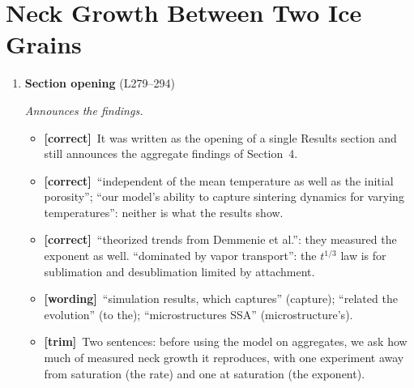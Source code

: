 \documentclass[11pt]{article}
\newcommand{\Pg}[3]{\item \textbf{#1} {\small(#2)}\par\textit{#3}}
\newcommand{\tC}{\textcolor{miss}{\textbf{[correct]}}\ }
\newcommand{\tG}{\textcolor{stale}{\textbf{[wording]}}\ }
\newcommand{\tT}{\textcolor{cut}{\textbf{[trim]}}\ }
\begin{document}
\section{Neck Growth Between Two Ice Grains}
\begin{enumerate}
\Pg{Section opening}{L279--294}{Announces the findings.}
  \begin{itemize}
  \item \tC It was written as the opening of a single Results section and
    still announces the aggregate findings of Section~4.
  \item \tC ``independent of the mean temperature as well as the initial
    porosity''; ``our model's ability to capture sintering dynamics for
    varying temperatures'': neither is what the results show.
  \item \tC ``theorized trends from Demmenie et al.'': they measured the
    exponent as well. ``dominated by vapor transport'': the $t^{1/3}$ law
    is for sublimation and desublimation limited by attachment.
  \item \tG ``simulation results, which captures'' (capture); ``related the
    evolution'' (to the); ``microstructures SSA'' (microstructure's).
  \item \tT Two sentences: before using the model on aggregates, we ask how
    much of measured neck growth it reproduces, with one experiment away
    from saturation (the rate) and one at saturation (the exponent).
  \end{itemize}
\end{enumerate}
\end{document}
